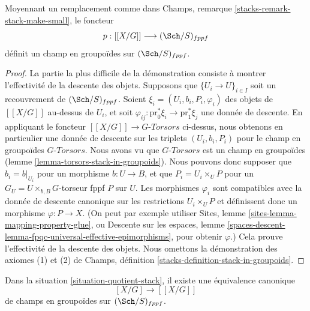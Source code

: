 \begin{lemma}
\label{lemma-group-quotient-stack-in-groupoids}
Moyennant un remplacement comme dans
Champs, remarque \ref{stacks-remark-stack-make-small},
le foncteur
$$
p : [[X/G]] \longrightarrow (\Sch/S)_{fppf}
$$
définit un champ en groupoïdes sur $(\Sch/S)_{fppf}$.
\end{lemma}

\begin{proof}
La partie la plus difficile de la démonstration consiste à montrer l'effectivité
de la descente des objets. Supposons que $\{U_i \to U\}_{i \in I}$ soit un recouvrement de
$(\Sch/S)_{fppf}$. Soient
$\xi_i = (U_i, b_i, P_i, \varphi_i)$ des objets de $[[X/G]]$ au-dessus de $U_i$,
et soit $\varphi_{ij} : \text{pr}_0^*\xi_i \to \text{pr}_1^*\xi_j$
une donnée de descente. En appliquant le foncteur
$[[X/G]] \to G\textit{-Torsors}$ ci-dessus, nous obtenons en particulier une donnée de descente
sur les triplets $(U_i, b_i, P_i)$ pour le champ en groupoïdes
$G\textit{-Torsors}$. Nous avons vu que
$G\textit{-Torsors}$ est un champ en groupoïdes
(lemme \ref{lemma-torsors-stack-in-groupoids}).
Nous pouvons donc supposer que $b_i = b|_{U_i}$ pour un morphisme $b : U \to B$, et
que $P_i = U_i \times_U P$ pour un $G_U = U \times_{b, B} G$-torseur fppf
$P$ sur $U$. Les morphismes $\varphi_i$ sont compatibles
avec la donnée de descente canonique sur les restrictions $U_i \times_U P$
et définissent donc un morphisme $\varphi : P \to X$. (On peut par exemple
utiliser
Sites, lemme \ref{sites-lemma-mapping-property-glue},
ou
Descente sur les espaces,
lemme \ref{spaces-descent-lemma-fpqc-universal-effective-epimorphisms},
pour obtenir $\varphi$.)
Cela prouve l'effectivité de la descente des objets.
Nous omettons la démonstration des axiomes (1) et (2) de
Champs, définition \ref{stacks-definition-stack-in-groupoids}.
\end{proof}

\begin{proposition}
\label{proposition-equal-quotient-stacks}
Dans la
situation \ref{situation-quotient-stack},
il existe une équivalence canonique
$$
[X/G] \longrightarrow [[X/G]]
$$
de champs en groupoïdes sur $(\Sch/S)_{fppf}$.
\end{proposition}

